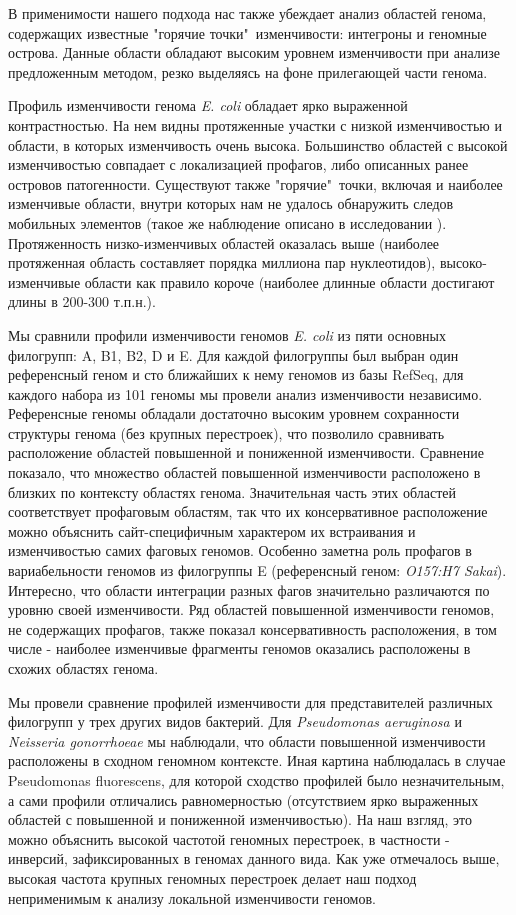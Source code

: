 В применимости нашего подхода нас также убеждает анализ областей генома, содержащих известные "горячие точки"\ изменчивости: интегроны и геномные острова. Данные области обладают высоким уровнем изменчивости при анализе предложенным методом, резко выделяясь на фоне прилегающей части генома. 

Профиль изменчивости генома \textit{E. coli} обладает ярко выраженной контрастностью. На нем видны протяженные участки с низкой изменчивостью и области, в которых изменчивость очень высока. Большинство областей с высокой изменчивостью совпадает с локализацией профагов, либо описанных ранее островов патогенности. Существуют также "горячие"\ точки, включая и наиболее изменчивые области, внутри которых нам не удалось обнаружить следов мобильных элементов (такое же наблюдение описано в исследовании \cite{oliveira2017chromosomal}). Протяженность низко-изменчивых областей оказалась выше (наиболее протяженная область составляет порядка миллиона пар нуклеотидов), высоко-изменчивые области как правило короче (наиболее длинные области достигают длины в 200-300 т.п.н.).

Мы сравнили профили изменчивости геномов \textit{E. coli} из пяти основных филогрупп: A, B1, B2, D и E. Для каждой филогруппы был выбран один референсный геном и сто ближайших к нему геномов из базы RefSeq, для каждого набора из 101 геномы мы провели анализ изменчивости независимо. Референсные геномы обладали достаточно высоким уровнем сохранности структуры генома (без крупных перестроек), что позволило сравнивать расположение областей повышенной и пониженной изменчивости. Сравнение показало, что множество областей повышенной изменчивости расположено в близких по контексту областях генома. Значительная часть этих областей соответствует профаговым областям, так что их консервативное расположение можно объяснить сайт-специфичным характером их встраивания и изменчивостью самих фаговых геномов. Особенно заметна роль профагов в вариабельности геномов из филогруппы E (референсный геном: \textit{O157:H7 Sakai}). Интересно, что области интеграции разных фагов значительно различаются по уровню своей изменчивости. Ряд областей повышенной изменчивости геномов, не содержащих профагов, также показал консервативность расположения, в том числе - наиболее изменчивые фрагменты геномов оказались расположены в схожих областях генома. 

Мы провели сравнение профилей изменчивости для представителей различных филогрупп у трех других видов бактерий. Для \textit{Pseudomonas aeruginosa} и \textit{Neisseria gonorrhoeae} мы наблюдали, что области повышенной изменчивости расположены в сходном геномном контексте. Иная картина наблюдалась в случае {Pseudomonas fluorescens}, для которой сходство профилей было незначительным, а сами профили отличались равномерностью (отсутствием ярко выраженных областей с повышенной и пониженной изменчивостью). На наш взгляд, это можно объяснить высокой частотой геномных перестроек, в частности - инверсий, зафиксированных в геномах данного вида. Как уже отмечалось выше, высокая частота крупных геномных перестроек делает наш подход неприменимым к анализу локальной изменчивости геномов. 

